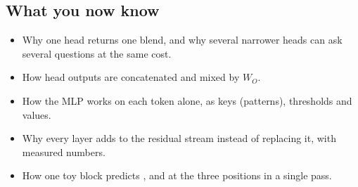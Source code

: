 \subsection*{What you now know}
\begin{itemize}
\item Why one head returns one blend, and why several narrower heads can ask several questions at the same cost.
\item How head outputs are concatenated and mixed by $W_O$.
\item How the MLP works on each token alone, as keys (patterns), thresholds and values.
\item Why every layer adds to the residual stream instead of replacing it, with measured numbers.
\item How one toy block predicts ,  and  at the three positions in a single pass.
\end{itemize}
